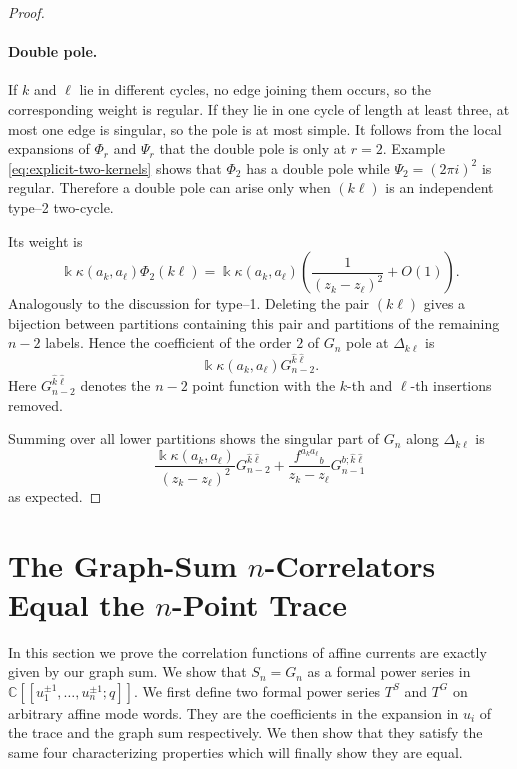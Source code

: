 \documentclass[11pt,a4paper]{amsart}
\numberwithin{equation}{section}
\theoremstyle{definition}
\theoremstyle{remark}
\newcommand{\CC}{\mathbb C}
\newcommand{\kk}{\Bbbk}
\newcommand{\ii}{i}
\begin{document}
\begin{proof}
\paragraph{Double pole.}
If $k$ and $\ell$ lie in different cycles, no edge joining them occurs, so the corresponding weight is regular.  If they lie in one cycle of length at least three, at most one edge is singular, so the pole is at most simple. It follows from the local expansions of $\Phi_r$ and $\Psi_r$ that the double pole is only at $r=2$. Example \eqref{eq:explicit-two-kernels} shows that $\Phi_2$ has a double pole while $\Psi_2=(2\pi\ii)^2$ is regular.  Therefore a double pole can arise only when $(k\ell)$ is an independent
type--2 two-cycle.

Its weight is
\begin{equation*}
  \kk\kappa(a_k,a_\ell)\Phi_2(k\ell)
  =\kk\kappa(a_k,a_\ell)
   \left(\frac1{(z_k-z_\ell)^2}+O(1)\right).
\end{equation*}
Analogously to the discussion for type--1. Deleting the pair $(k\ell)$ gives a bijection between partitions containing this pair and partitions of the remaining $n-2$ labels. Hence the coefficient of the order $2$ of $G_n$ pole at $\Delta_{k\ell}$ is
\begin{equation*}
 \kk\kappa(a_k,a_\ell)G_{n-2}^{\widehat k\widehat\ell}.
\end{equation*}
Here $G_{n-2}^{\widehat k\widehat\ell}$ denotes the $n-2$ point function with the $k$-th and $\ell$-th insertions removed.


 Summing over all lower partitions shows the singular part of $G_n$ along $\Delta_{k\ell}$ is
\begin{equation}
\frac{\kk\kappa(a_k,a_\ell)}{(z_k-z_\ell)^2}G_{n-2}^{\widehat k\widehat\ell}
 +\frac{f^{a_ka_\ell}{}_{b}}{z_k-z_\ell}
  G_{n-1}^{b;\widehat k\widehat\ell}
\end{equation}
as expected.
\end{proof}

\section{The Graph-Sum $n$-Correlators Equal the 
	$n$-Point Trace}
\label{sec:formal-proof}

In this section we prove the correlation functions of affine currents are exactly given by our graph sum. We show that $S_n=G_n$ as a formal power series in $\CC[[u_1^{\pm1},\ldots,u_n^{\pm1};q]]$. We first define two formal power series $T^S$ and $T^G$ on arbitrary affine mode words. They are the coefficients in the expansion in $u_i$ of the trace and the graph sum respectively. We then show that they satisfy the same four characterizing properties which will finally show they are equal.
\end{document}
